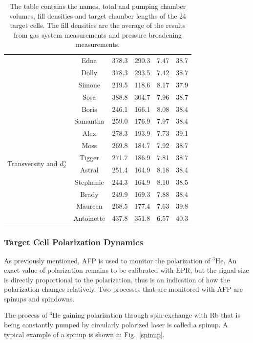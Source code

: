 \begin{table}
\begin{center}
\begin{tabular}{|c|c|c|c|c|c|}
			& Edna & 378.3 & 290.3 & 7.47 & 38.7\\ \cline{2-6}
			& Dolly & 378.3 & 293.5 & 7.42 & 38.7\\ \cline{2-6}
			& Simone & 219.5 & 118.6 & 8.17 & 37.9\\ \cline{2-6}
			& Sosa & 388.8 & 304.7 & 7.96 & 38.7\\ \hline
			\multirow{10}{*}{\begin{sideways}Transversity and $d_{2}^{n}$\end{sideways}} 
			& Boris & 246.1 & 166.1 & 8.08 & 38.4\\ \cline{2-6} 
			& Samantha & 259.0 & 176.9 & 7.97 & 38.4\\ \cline{2-6}
			& Alex & 278.3 & 193.9 & 7.73 & 39.1\\ \cline{2-6}
			& Moss & 269.8 & 184.7 & 7.92 & 38.7\\ \cline{2-6}
			& Tigger & 271.7 & 186.9 & 7.81 & 38.7\\ \cline{2-6}
			& Astral & 251.4 & 164.9 & 8.18 & 38.4\\ \cline{2-6}
			& Stephanie & 244.3 & 164.9 & 8.10 & 38.5\\ \cline{2-6}
			& Brady & 249.9 & 169.3 & 7.88 & 38.4\\ \cline{2-6}
			& Maureen & 268.5 & 177.4 & 7.63 & 39.8\\ \cline{2-6}
			& Antoinette & 437.8 & 351.8 & 6.57 & 40.3\\ \hline
		\end{tabular}
	\end{center}
	\caption{The table contains the names, total and pumping chamber volumes, fill densities and target chamber lengths of the 24 target cells. The fill densities are the average of the results from gas system measurements and pressure broadening measurements.}
\end{table}

\subsubsection{Target Cell Polarization Dynamics}

As previously mentioned, AFP is used to monitor the polarization of $^{3}$He. An exact value of polarization remains to be calibrated with EPR, but the signal size is directly proportional to the polarization, thus is an indication of how the polarization changes relatively. Two processes that are monitored with AFP are spinups and spindowns. 

The process of $^{3}$He gaining polarization through spin-exchange with Rb that is being constantly pumped by circularly polarized laser is called a spinup. A typical example of a spinup is shown in Fig.~\ref{spinup}.

